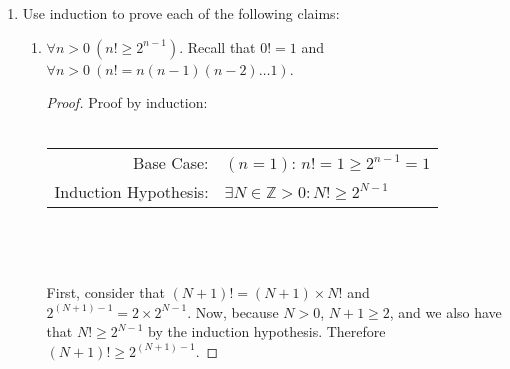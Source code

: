 \documentclass[10pt]{article}
\newcommand{\ints}{\mathbb{Z}}
\begin{document}
\begin{enumerate}

\addtocounter{enumi}{3}
\item
Use induction to prove each of the following claims:
\begin{enumerate}
\addtocounter{enumii}{1}
\item
$\forall n > 0 \> (n! \geq 2^{n-1})$.  Recall that $0! = 1$ and $\forall n > 0 \> (n! = n(n-1)(n-2) \ldots 1)$.
\begin{proof} Proof by induction: \\ \\
\begin{tabular}{r l}
Base Case: & $(n = 1)$:  $n! = 1 \geq 2^{n-1} = 1$ \\
Induction Hypothesis: & $\exists N \in \ints > 0: N! \geq 2^{N-1}$ \\
\end{tabular}
\\ \\ \\
First, consider that $(N+1)! = (N+1) \times N!$ and $2^{(N+1)-1} = 2 \times 2^{N-1} $.  Now, because $N > 0$, $N+1 \geq 2$, and we also have that $N! \geq 2^{N-1}$ by the induction hypothesis.  Therefore $(N+1)! \geq 2^{(N+1)-1}$.
\end{proof}
\end{enumerate}



\end{enumerate}
\end{document}
